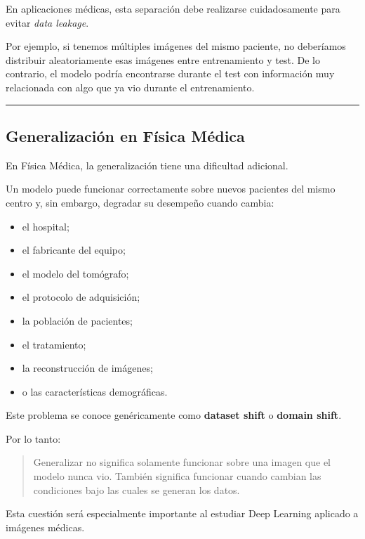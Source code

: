\documentclass[
  letterpaper,
  DIV=11,
  numbers=noendperiod]{scrartcl}
\providecommand{\tightlist}{%
  \setlength{\itemsep}{0pt}\setlength{\parskip}{0pt}}
\begin{document}
En aplicaciones médicas, esta separación debe realizarse cuidadosamente
para evitar \emph{data leakage}.

Por ejemplo, si tenemos múltiples imágenes del mismo paciente, no
deberíamos distribuir aleatoriamente esas imágenes entre entrenamiento y
test. De lo contrario, el modelo podría encontrarse durante el test con
información muy relacionada con algo que ya vio durante el
entrenamiento.

\begin{center}\rule{0.5\linewidth}{0.5pt}\end{center}

\subsection{Generalización en Física
Médica}\label{generalizaciuxf3n-en-fuxedsica-muxe9dica}

En Física Médica, la generalización tiene una dificultad adicional.

Un modelo puede funcionar correctamente sobre nuevos pacientes del mismo
centro y, sin embargo, degradar su desempeño cuando cambia:

\begin{itemize}
\tightlist
\item
  el hospital;
\item
  el fabricante del equipo;
\item
  el modelo del tomógrafo;
\item
  el protocolo de adquisición;
\item
  la población de pacientes;
\item
  el tratamiento;
\item
  la reconstrucción de imágenes;
\item
  o las características demográficas.
\end{itemize}

Este problema se conoce genéricamente como \textbf{dataset shift} o
\textbf{domain shift}.

Por lo tanto:

\begin{quote}
Generalizar no significa solamente funcionar sobre una imagen que el
modelo nunca vio. También significa funcionar cuando cambian las
condiciones bajo las cuales se generan los datos.
\end{quote}

Esta cuestión será especialmente importante al estudiar Deep Learning
aplicado a imágenes médicas.
\end{document}

